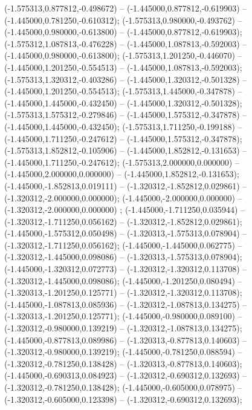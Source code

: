  (-1.575313,0.877812,-0.498672) -- (-1.445000,0.877812,-0.619903) -- (-1.445000,0.781250,-0.610312);
 (-1.575313,0.980000,-0.493762) -- (-1.445000,0.980000,-0.613800) -- (-1.445000,0.877812,-0.619903);
 (-1.575312,1.087813,-0.476228) -- (-1.445000,1.087813,-0.592003) -- (-1.445000,0.980000,-0.613800);
 (-1.575313,1.201250,-0.446070) -- (-1.445000,1.201250,-0.554513) -- (-1.445000,1.087813,-0.592003);
 (-1.575313,1.320312,-0.403286) -- (-1.445000,1.320312,-0.501328) -- (-1.445000,1.201250,-0.554513);
 (-1.575313,1.445000,-0.347878) -- (-1.445000,1.445000,-0.432450) -- (-1.445000,1.320312,-0.501328);
 (-1.575313,1.575312,-0.279846) -- (-1.445000,1.575312,-0.347878) -- (-1.445000,1.445000,-0.432450);
 (-1.575313,1.711250,-0.199188) -- (-1.445000,1.711250,-0.247612) -- (-1.445000,1.575312,-0.347878);
 (-1.575313,1.852812,-0.105906) -- (-1.445000,1.852812,-0.131653) -- (-1.445000,1.711250,-0.247612);
 (-1.575313,2.000000,0.000000) -- (-1.445000,2.000000,0.000000) -- (-1.445000,1.852812,-0.131653);
 (-1.445000,-1.852813,0.019111) -- (-1.320312,-1.852812,0.029861) -- (-1.320312,-2.000000,0.000000);
 (-1.445000,-2.000000,0.000000) -- (-1.320312,-2.000000,0.000000) ;
 (-1.445000,-1.711250,0.035944) -- (-1.320312,-1.711250,0.056162) -- (-1.320312,-1.852812,0.029861);
 (-1.445000,-1.575312,0.050498) -- (-1.320313,-1.575313,0.078904) -- (-1.320312,-1.711250,0.056162);
 (-1.445000,-1.445000,0.062775) -- (-1.320312,-1.445000,0.098086) -- (-1.320313,-1.575313,0.078904);
 (-1.445000,-1.320312,0.072773) -- (-1.320312,-1.320312,0.113708) -- (-1.320312,-1.445000,0.098086);
 (-1.445000,-1.201250,0.080494) -- (-1.320313,-1.201250,0.125771) -- (-1.320312,-1.320312,0.113708);
 (-1.445000,-1.087813,0.085936) -- (-1.320312,-1.087813,0.134275) -- (-1.320313,-1.201250,0.125771);
 (-1.445000,-0.980000,0.089100) -- (-1.320312,-0.980000,0.139219) -- (-1.320312,-1.087813,0.134275);
 (-1.445000,-0.877813,0.089986) -- (-1.320313,-0.877813,0.140603) -- (-1.320312,-0.980000,0.139219);
 (-1.445000,-0.781250,0.088594) -- (-1.320312,-0.781250,0.138428) -- (-1.320313,-0.877813,0.140603);
 (-1.445000,-0.690313,0.084923) -- (-1.320312,-0.690312,0.132693) -- (-1.320312,-0.781250,0.138428);
 (-1.445000,-0.605000,0.078975) -- (-1.320312,-0.605000,0.123398) -- (-1.320312,-0.690312,0.132693);

